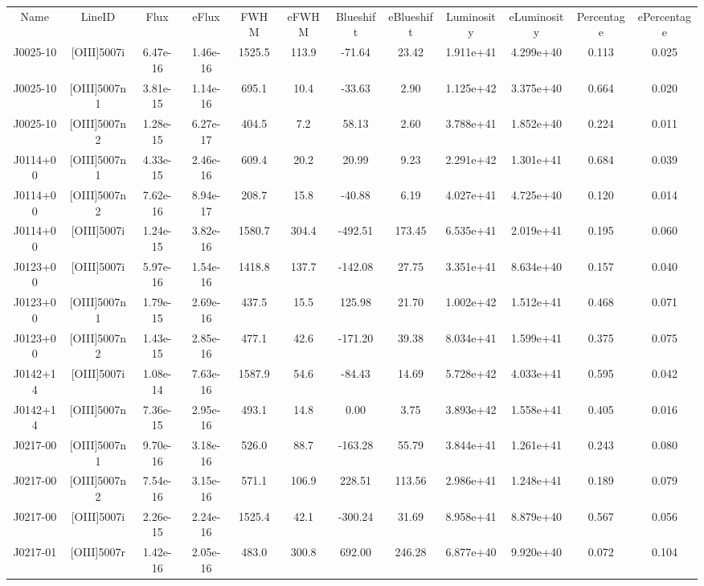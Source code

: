 \begin{table}
\begin{tabular}{cccccccccccc}
Name & LineID & Flux & eFlux & FWHM & eFWHM & Blueshift & eBlueshift & Luminosity & eLuminosity & Percentage & ePercentage \\
J0025-10 & [OIII]5007i & 6.47e-16 & 1.46e-16 & 1525.5 & 113.9 & -71.64 & 23.42 & 1.911e+41 & 4.299e+40 & 0.113 & 0.025 \\
J0025-10 & [OIII]5007n1 & 3.81e-15 & 1.14e-16 & 695.1 & 10.4 & -33.63 & 2.90 & 1.125e+42 & 3.375e+40 & 0.664 & 0.020 \\
J0025-10 & [OIII]5007n2 & 1.28e-15 & 6.27e-17 & 404.5 & 7.2 & 58.13 & 2.60 & 3.788e+41 & 1.852e+40 & 0.224 & 0.011 \\
J0114+00 & [OIII]5007n1 & 4.33e-15 & 2.46e-16 & 609.4 & 20.2 & 20.99 & 9.23 & 2.291e+42 & 1.301e+41 & 0.684 & 0.039 \\
J0114+00 & [OIII]5007n2 & 7.62e-16 & 8.94e-17 & 208.7 & 15.8 & -40.88 & 6.19 & 4.027e+41 & 4.725e+40 & 0.120 & 0.014 \\
J0114+00 & [OIII]5007i & 1.24e-15 & 3.82e-16 & 1580.7 & 304.4 & -492.51 & 173.45 & 6.535e+41 & 2.019e+41 & 0.195 & 0.060 \\
J0123+00 & [OIII]5007i & 5.97e-16 & 1.54e-16 & 1418.8 & 137.7 & -142.08 & 27.75 & 3.351e+41 & 8.634e+40 & 0.157 & 0.040 \\
J0123+00 & [OIII]5007n1 & 1.79e-15 & 2.69e-16 & 437.5 & 15.5 & 125.98 & 21.70 & 1.002e+42 & 1.512e+41 & 0.468 & 0.071 \\
J0123+00 & [OIII]5007n2 & 1.43e-15 & 2.85e-16 & 477.1 & 42.6 & -171.20 & 39.38 & 8.034e+41 & 1.599e+41 & 0.375 & 0.075 \\
J0142+14 & [OIII]5007i & 1.08e-14 & 7.63e-16 & 1587.9 & 54.6 & -84.43 & 14.69 & 5.728e+42 & 4.033e+41 & 0.595 & 0.042 \\
J0142+14 & [OIII]5007n & 7.36e-15 & 2.95e-16 & 493.1 & 14.8 & 0.00 & 3.75 & 3.893e+42 & 1.558e+41 & 0.405 & 0.016 \\
J0217-00 & [OIII]5007n1 & 9.70e-16 & 3.18e-16 & 526.0 & 88.7 & -163.28 & 55.79 & 3.844e+41 & 1.261e+41 & 0.243 & 0.080 \\
J0217-00 & [OIII]5007n2 & 7.54e-16 & 3.15e-16 & 571.1 & 106.9 & 228.51 & 113.56 & 2.986e+41 & 1.248e+41 & 0.189 & 0.079 \\
J0217-00 & [OIII]5007i & 2.26e-15 & 2.24e-16 & 1525.4 & 42.1 & -300.24 & 31.69 & 8.958e+41 & 8.879e+40 & 0.567 & 0.056 \\
J0217-01 & [OIII]5007r & 1.42e-16 & 2.05e-16 & 483.0 & 300.8 & 692.00 & 246.28 & 6.877e+40 & 9.920e+40 & 0.072 & 0.104 \\

\end{tabular}
\end{table}

